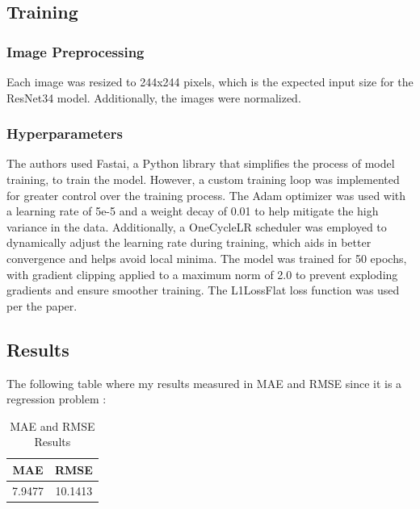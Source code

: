 \documentclass[10pt,twocolumn,letterpaper]{article}
\begin{document}
\subsection{Training}
\subsubsection{Image Preprocessing}
Each image was resized to 244x244 pixels, which is the expected input size for the ResNet34 model. Additionally, the images were normalized.

\subsubsection{Hyperparameters}
The authors used Fastai, a Python library that simplifies the process of model training, to train the model. However, a custom training loop was implemented for greater control over the training process. The Adam optimizer was used with a learning rate of 5e-5 and a weight decay of 0.01 to help mitigate the high variance in the data. Additionally, a OneCycleLR scheduler was employed to dynamically adjust the learning rate during training, which aids in better convergence and helps avoid local minima. The model was trained for 50 epochs, with gradient clipping applied to a maximum norm of 2.0 to prevent exploding gradients and ensure smoother training. The L1LossFlat loss function was used per the paper.

\subsection{Results}
The following table where my results measured in MAE and RMSE since it is a regression problem :
\begin{table}[h!]
\centering
\begin{tabular}{|c|c|}
\hline
 \bf{MAE} & \bf{RMSE} \\ \hline
 7.9477 & 10.1413 \\ \hline
\end{tabular}
\caption{ MAE and RMSE Results }
\label{tab:best_results}
\end{table}





{\small



}
\end{document}
